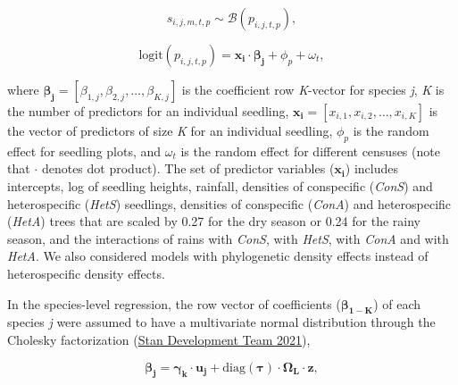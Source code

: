 \documentclass[
  12pt,
  letterpaper,
  DIV=11,
  numbers=noendperiod]{scrartcl}
\begin{document}
\[
s_{i,j,m,t,p} \sim \mathcal{B}(p_{i, j, t, p}),
\]

\[
\mathrm{logit}(p_{i,j,t,p}) = \boldsymbol{x_{i}} \cdot \boldsymbol{\beta_{j}} + \phi_p + \omega_t,
\]

where
\(\boldsymbol{\beta_{j}} = \left[\beta_{1,j}, \beta_{2,j}, \ldots, \beta_{K,j} \right]\)
is the coefficient row \emph{K}-vector for species \emph{j}, \emph{K} is
the number of predictors for an individual seedling,
\(\boldsymbol{x_i} = \left[x_{i,1},x _{i,2}, \ldots,x_{i,K} \right]\) is
the vector of predictors of size \emph{K} for an individual seedling,
\(\phi_p\) is the random effect for seedling plots, and \(\omega_t\) is
the random effect for different censuses (note that \(\cdot\) denotes
dot product). The set of predictor variables (\(\boldsymbol{x_i}\))
includes intercepts, log of seedling heights, rainfall, densities of
conspecific (\emph{ConS}) and heterospecific (\emph{HetS}) seedlings,
densities of conspecific (\emph{ConA}) and heterospecific (\emph{HetA})
trees that are scaled by 0.27 for the dry season or 0.24 for the rainy
season, and the interactions of rains with \emph{ConS}, with
\emph{HetS}, with \emph{ConA} and with \emph{HetA}. We also considered
models with phylogenetic density effects instead of heterospecific
density effects.

In the species-level regression, the row vector of coefficients
(\(\boldsymbol{\beta_{1-K}}\)) of each species \emph{j} were assumed to
have a multivariate normal distribution through the Cholesky
factorization (\protect\hyperlink{ref-StanDevelopmentTeam2021}{Stan
Development Team 2021}),

\[
\boldsymbol{\beta_j} = \boldsymbol{\gamma_k} \cdot \boldsymbol{u_j} + \mathrm{diag}(\boldsymbol{\tau})\cdot \boldsymbol{\Omega_L} \cdot \boldsymbol{z},
\]
\end{document}
